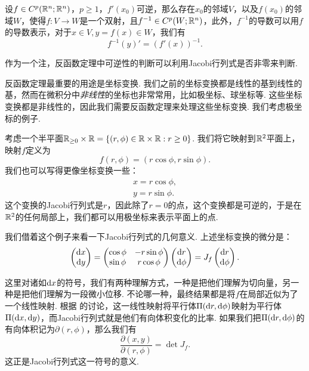 \begin{theorem}[反函数定理]\label{theorem:inverse-function}
    设$f\in C^p(\mathbb{R}^n;\mathbb{R}^n)$，$p\geq 1$，$f'(x_0)$可逆，那么存在$x_0$的邻域$V$，以及$f(x_0)$的邻域$W$，使得$f:V\to W$是一个双射，且$f^{-1}\in C^p(W;\mathbb{R}^n)$，此外，$f^{-1}$的导数可以用$f$的导数表示，对于$x\in V,y=f(x)\in W$，我们有
    \[f^{-1}(y)'=(f'(x))^{-1}.\]
\end{theorem}

作为一个注，反函数定理中可逆性的判断可以利用Jacobi行列式是否非零来判断. 

反函数定理最重要的用途是坐标变换. 我们之前的坐标变换都是线性的基到线性的基，然而在微积分中\textit{非线性}的坐标也非常常用，比如极坐标、球坐标等. 这些坐标变换都是非线性的，因此我们需要反函数定理来处理这些坐标变换. 我们考虑极坐标的例子. 

\begin{example}[极坐标]\label{example:polar-coordinates}
    考虑一个半平面$\mathbb{R}_{\geq 0}\times\mathbb{R}=\{(r,\phi)\in\mathbb{R}\times\mathbb{R}:r\geq 0\}$. 我们将它映射到$\mathbb{R}^2$平面上，映射$f$定义为
    \[f(r,\phi)=(r\cos\phi,r\sin\phi).\]
    我们也可以写得更像坐标变换一些：
    \begin{gather*}
        x=r\cos\phi, \\
        y=r\sin\phi.
    \end{gather*}
    这个变换的Jacobi行列式是$r$，因此除了$r=0$的点，这个变换都是可逆的，于是在$\mathbb{R}^2$的任何局部上，我们都可以用极坐标来表示平面上的点.

    我们借着这个例子来看一下Jacobi行列式的几何意义. 上述坐标变换的微分是：
    \[\begin{pmatrix}
        \mathrm{d} x \\
        \mathrm{d} y
    \end{pmatrix}=\begin{pmatrix}
        \cos\phi & -r\sin\phi \\
        \sin\phi & r\cos\phi
    \end{pmatrix}\begin{pmatrix}
        \mathrm{d} r \\
        \mathrm{d}\phi
    \end{pmatrix}=J_f \begin{pmatrix}
        \mathrm{d} r \\
        \mathrm{d}\phi
    \end{pmatrix}.\]

    这里对诸如$\mathrm{d} x$的符号，我们有两种理解方式，一种是把他们理解为切向量，另一种是把他们理解为一段微小位移. 不论哪一种，最终结果都是将$f$在局部近似为了一个线性映射. 根据 的讨论，这一线性映射将平行体$\Pi(\mathrm{d} r,\mathrm{d} \phi)$映射为平行体$\Pi(\mathrm{d} x,\mathrm{d} y)$，而Jacobi行列式就是他们有向体积变化的比率. 如果我们把$\Pi(\mathrm{d} r,\mathrm{d} \phi)$的有向体积记为$\partial(r,\phi)$，那么我们有
    \[\frac{\partial(x,y)}{\partial(r,\phi)}=\det J_f.\]
    这正是Jacobi行列式这一符号的意义. 
    

\end{example}
